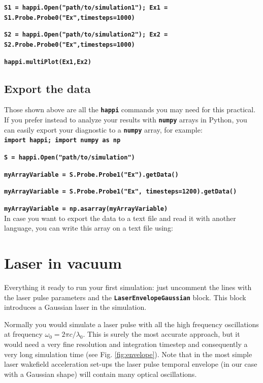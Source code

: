 \documentclass{article}
\newcommand{\commandline}[1]{\texttt{\textbf{#1}}}
\begin{document}
\commandline{S1 = happi.Open("path/to/simulation1"); Ex1 = S1.Probe.Probe0("Ex",timesteps=1000)}

\commandline{S2 = happi.Open("path/to/simulation2"); Ex2 = S2.Probe.Probe0("Ex",timesteps=1000)}

\commandline{happi.multiPlot(Ex1,Ex2)}

\subsection*{Export the data}
Those shown above are all the \commandline{happi} commands you may need for this practical. If you prefer instead to analyze your results with \commandline{numpy} arrays in Python, you can easily export your diagnostic to a \commandline{numpy} array, for example:\\

\commandline{import happi; import numpy as np}

\commandline{S =  happi.Open("path/to/simulation")}

\commandline{myArrayVariable = S.Probe.Probe1("Ex").getData()} 

\commandline{myArrayVariable = S.Probe.Probe1("Ex", timesteps=1200).getData()}

\commandline{myArrayVariable = np.asarray(myArrayVariable) }\\

In case you want to export the data to a text file and read it with another language, you can write this array on a text file using:

\newpage

\section{Laser in vacuum}
Everything it ready to run your first simulation: just uncomment the lines with the laser pulse parameters and the \commandline{LaserEnvelopeGaussian} block. This block introduces a Gaussian laser in the simulation.

Normally you would simulate a laser pulse with all the high frequency oscillations at frequency $\omega_0=2\pi c/\lambda_0$. This is surely the most accurate approach, but it would need a very fine resolution and integration timestep and consequently a very long simulation time (see Fig. \ref{fig:envelope}). Note that in the most simple laser wakefield acceleration set-ups the laser pulse temporal envelope (in our case with a Gaussian shape) will contain many optical oscillations.
\end{document}
